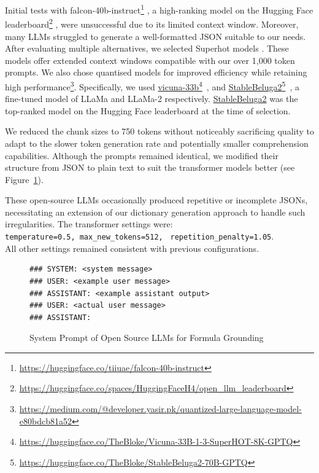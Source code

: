 Initial tests with falcon-40b-instruct\footnote{\url{https://huggingface.co/tiiuae/falcon-40b-instruct}} \citep{falcon40b, refinedweb, xu2023baize}, a high-ranking model on the Hugging Face leaderboard\footnote{\url{https://huggingface.co/spaces/HuggingFaceH4/open_llm_leaderboard}} \citep{jain2022hugging}, were unsuccessful due to its limited context window. Moreover, many LLMs struggled to generate a well-formatted JSON suitable to our needs. After evaluating multiple alternatives, we selected Superhot models \citep{chen2023extending}. These models offer extended context windows compatible with our over 1,000 token prompts. We also chose quantised models for improved efficiency while retaining high performance\footnote{\url{https://medium.com/@developer.yasir.pk/quantized-large-language-model-e80bdcb81a52}}. Specifically, we used \href{https://huggingface.co/TheBloke/Vicuna-33B-1-3-SuperHOT-8K-GPTQ}{vicuna-33b}\footnote{\url{https://huggingface.co/TheBloke/Vicuna-33B-1-3-SuperHOT-8K-GPTQ}}~\citep{zheng2023judging}, and \href{https://huggingface.co/TheBloke/StableBeluga2-70B-GPTQ}{StableBeluga2}\footnote{\url{https://huggingface.co/TheBloke/StableBeluga2-70B-GPTQ}}~\citep{StableBelugaModels, touvron2023llama, mukherjee2023orca}, a fine-tuned model of LLaMa and LLaMa-2 respectively. \href{https://huggingface.co/TheBloke/StableBeluga2-70B-GPTQ}{StableBeluga2} was the top-ranked model on the Hugging Face leaderboard at the time of selection.

We reduced the chunk sizes to 750 tokens without noticeably sacrificing quality to adapt to the slower token generation rate and potentially smaller comprehension capabilities. Although the prompts remained identical, we modified their structure from JSON to plain text to suit the transformer models better (see Figure~\ref{fig:open-source-prompt-structure}). 

These open-source LLMs occasionally produced repetitive or incomplete JSONs, necessitating an extension of our dictionary generation approach to handle such irregularities. The transformer settings were:\\
\texttt{temperature=0.5, max\_new\_tokens=512,} \texttt{ repetition\_penalty=1.05}.\\
All other settings remained consistent with previous configurations.

\begin{figure}[htpb]
  \centering
  \begin{lstlisting}
### SYSTEM: <system message>
### USER: <example user message>
### ASSISTANT: <example assistant output>
### USER: <actual user message>
### ASSISTANT:
  \end{lstlisting}
  \caption[System Prompt for Annotation]{System Prompt of Open Source LLMs for Formula Grounding}\label{fig:open-source-prompt-structure}
\end{figure}

